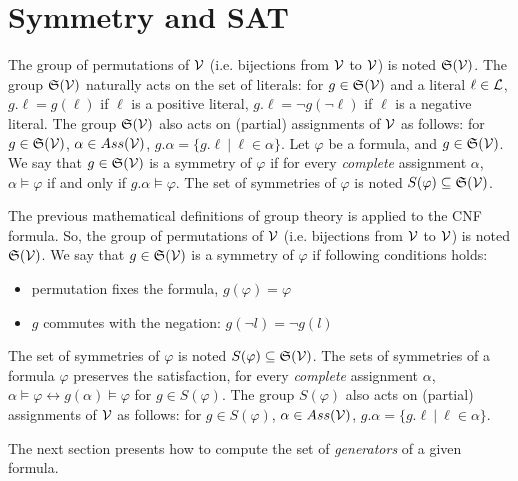 \chapter{Symmetry and SAT}\label{chap:symmetryinsat}



The group of permutations of $\mathcal{V}$ (i.e. bijections from $\mathcal{V}$ to $\mathcal{V}$) is noted
$\mathfrak{S}(\mathcal{V})$. The group $\mathfrak{S}(\mathcal{V})$ naturally acts on the set of literals: for $g
\in \mathfrak{S}(\mathcal{V})$ and a literal $\ell \in \mathcal{L} $, $g.\ell = g(\ell)$ if $\ell$ is a
positive literal, $g.\ell = \neg g(\neg \ell)$ if $\ell$ is a negative literal.
The group $\mathfrak{S}(\mathcal{V})$ also acts on (partial) assignments of $\mathcal{V}$ as follows: for
$g \in \mathfrak{S}(\mathcal{V})$, $\alpha \in Ass(\mathcal{V})$, $g.\alpha = \{ g.\ell ~|~ \ell \in \alpha \}$. Let $\varphi$ be a formula, and $g \in \mathfrak{S}(\mathcal{V})$. We say that $g\in \mathfrak{S}(\mathcal{V})$ is a
symmetry of $ \varphi$ if for every \emph{complete} assignment $\alpha$, $\alpha
\models \varphi$ if and only if $g.\alpha \models \varphi$. The set of symmetries
of $\varphi$ is noted $S(\varphi) \subseteq \mathfrak{S}(\mathcal{V})$.



The previous mathematical definitions of group theory is applied to the CNF formula.
So, the group of permutations of $\mathcal{V}$ (i.e. bijections from $\mathcal{V}$ to $\mathcal{V}$) is noted
$\mathfrak{S}(\mathcal{V})$. We say that $g\in \mathfrak{S}(\mathcal{V})$ is a symmetry of $ \varphi$ if following conditions holds:
\vspace{-1em}
\begin{itemize}[topsep=1em]
	\item permutation fixes the formula, $g(\varphi) =  \varphi$ 
	\item $g$  commutes with the negation: $g(\neg l)  = \neg g(l)$
\end{itemize}

The set of symmetries of $\varphi$ is noted $S(\varphi) \subseteq \mathfrak{S}(\mathcal{V})$.
The sets of symmetries of a formula $\varphi$ preserves the satisfaction,
for every \emph{complete} assignment $\alpha$, 
$\alpha \models \varphi \leftrightarrow g(\alpha) \models \varphi$ for $g \in S(\varphi)$.
The group $S(\varphi)$ also acts on (partial) assignments of $\mathcal{V}$ as follows: for
$g \in S(\varphi)$, $\alpha \in Ass(\mathcal{V})$, $g.\alpha = \{ g.\ell ~|~ \ell \in \alpha \}$.


The next section presents how to compute the set of \emph{generators} of a given formula.

